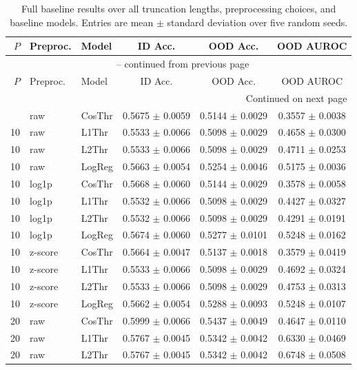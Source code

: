 \begin{longtable}{rllccc}
\hline\hline
\(P\) & Preproc. & Model & ID Acc. & OOD Acc. & OOD AUROC \\
\hline
\endfirsthead
\multicolumn{6}{c}{\tablename~\thetable{} -- continued from previous page}\\
\hline\hline
\(P\) & Preproc. & Model & ID Acc. & OOD Acc. & OOD AUROC \\
\hline
\endhead
\hline
\multicolumn{6}{r}{Continued on next page}\\
\endfoot
\hline\hline
\caption{Full baseline results over all truncation lengths, preprocessing choices, and baseline models. Entries are mean $\pm$ standard deviation over five random seeds.}
\label{tab:baseline-full}
\endlastfoot
10 & raw & CosThr & 0.5675 $\pm$ 0.0059 & 0.5144 $\pm$ 0.0029 & 0.3557 $\pm$ 0.0038 \\
10 & raw & L1Thr & 0.5533 $\pm$ 0.0066 & 0.5098 $\pm$ 0.0029 & 0.4658 $\pm$ 0.0300 \\
10 & raw & L2Thr & 0.5533 $\pm$ 0.0066 & 0.5098 $\pm$ 0.0029 & 0.4711 $\pm$ 0.0253 \\
10 & raw & LogReg & 0.5663 $\pm$ 0.0054 & 0.5254 $\pm$ 0.0046 & 0.5175 $\pm$ 0.0036 \\
10 & log1p & CosThr & 0.5668 $\pm$ 0.0060 & 0.5144 $\pm$ 0.0029 & 0.3578 $\pm$ 0.0058 \\
10 & log1p & L1Thr & 0.5532 $\pm$ 0.0066 & 0.5098 $\pm$ 0.0029 & 0.4427 $\pm$ 0.0327 \\
10 & log1p & L2Thr & 0.5532 $\pm$ 0.0066 & 0.5098 $\pm$ 0.0029 & 0.4291 $\pm$ 0.0191 \\
10 & log1p & LogReg & 0.5674 $\pm$ 0.0060 & 0.5277 $\pm$ 0.0101 & 0.5248 $\pm$ 0.0162 \\
10 & z-score & CosThr & 0.5664 $\pm$ 0.0047 & 0.5137 $\pm$ 0.0018 & 0.3579 $\pm$ 0.0419 \\
10 & z-score & L1Thr & 0.5533 $\pm$ 0.0066 & 0.5098 $\pm$ 0.0029 & 0.4692 $\pm$ 0.0324 \\
10 & z-score & L2Thr & 0.5533 $\pm$ 0.0066 & 0.5098 $\pm$ 0.0029 & 0.4753 $\pm$ 0.0313 \\
10 & z-score & LogReg & 0.5662 $\pm$ 0.0054 & 0.5288 $\pm$ 0.0093 & 0.5248 $\pm$ 0.0107 \\
20 & raw & CosThr & 0.5999 $\pm$ 0.0066 & 0.5437 $\pm$ 0.0049 & 0.4647 $\pm$ 0.0110 \\
20 & raw & L1Thr & 0.5767 $\pm$ 0.0045 & 0.5342 $\pm$ 0.0042 & 0.6330 $\pm$ 0.0469 \\
20 & raw & L2Thr & 0.5767 $\pm$ 0.0045 & 0.5342 $\pm$ 0.0042 & 0.6748 $\pm$ 0.0508 \\

\end{longtable}
